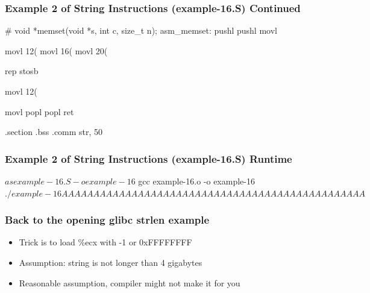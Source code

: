 \documentclass[11pt,xcolor=dvipsnames]{beamer}
\newcommand{\mvs}{\vspace{-0.95em}}
\begin{document}
\begin{frame}[fragile,t]
\mvs
\frametitle{Example 2 of String Instructions (example-16.S) Continued}
\begin{gascode}
# void *memset(void *s, int c, size_t n);
asm_memset:
  pushl %
  pushl %
  movl %

  movl 12(%
  movl 16(%
  movl 20(%

  rep stosb

  movl 12(%

  movl %
  popl %
  popl %
  ret

.section .bss
.comm str, 50
\end{gascode}
\end{frame}

\begin{frame}[fragile,t]
\mvs
\frametitle{Example 2 of String Instructions (example-16.S) Runtime}
\begin{textcode}
$ as example-16.S -o example-16
$ gcc example-16.o -o example-16
$ ./example-16
AAAAAAAAAAAAAAAAAAAAAAAAAAAAAAAAAAAAAAAAAAAAAAAA
$
\end{textcode}
\end{frame}

\begin{frame}[fragile,t]
\mvs
\frametitle{Back to the opening glibc strlen example}
\begin{itemize}
  \item Trick is to load {\ttfamily \%ecx} with -1 or {\ttfamily 0xFFFFFFFF}
  \item Assumption: string is not longer than 4 gigabytes
  \item Reasonable assumption, compiler might not make it for you
\end{itemize}
\end{frame}
\end{document}
